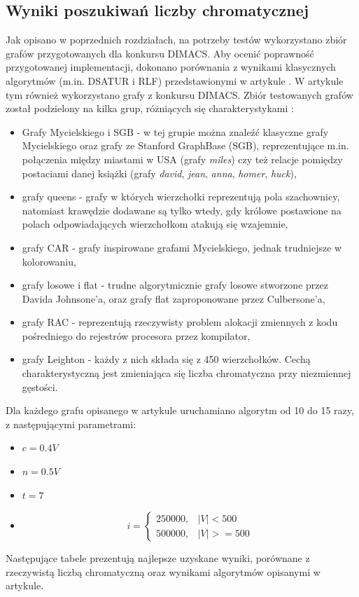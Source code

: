 \documentclass[12pt,a4paper]{article}
\begin{document}
\subsection{Wyniki poszukiwań liczby chromatycznej}
Jak opisano w poprzednich rozdziałach, na potrzeby testów wykorzystano zbiór grafów przygotowanych dla konkursu DIMACS. Aby ocenić poprawność przygotowanej implementacji, dokonano porównania z wynikami klasycznych algorytmów (m.in. DSATUR i RLF) przedstawionymi w artykule \cite{article}.
W artykule tym również wykorzystano grafy z konkursu DIMACS. Zbiór testowanych grafów został podzielony na kilka grup, różniących się charakterystykami :
\begin{itemize}
\item Grafy Mycielskiego i SGB - w tej grupie można znaleźć klasyczne grafy Mycielskiego oraz grafy ze Stanford GraphBase (SGB), reprezentujące m.in. połączenia między miastami w USA (grafy \textit{miles}) czy też relacje pomiędzy postaciami danej książki (grafy \textit{david}, \textit{jean}, \textit{anna}, \textit{homer}, \textit{huck}),
\item grafy queens - grafy w których wierzchołki reprezentują pola szachownicy, natomiast krawędzie dodawane są tylko wtedy, gdy królowe postawione na polach odpowiadających wierzchołkom atakują się wzajemnie,
\item grafy CAR - grafy inspirowane grafami Mycielskiego, jednak trudniejsze w kolorowaniu,
\item grafy losowe i flat - trudne algorytmicznie grafy losowe stworzone przez Davida Johnsone'a, oraz grafy flat zaproponowane przez Culbersone'a,
\item grafy RAC - reprezentują rzeczywisty problem alokacji zmiennych z kodu pośredniego do rejestrów procesora przez kompilator,
\item grafy Leighton - każdy z nich składa się z 450 wierzchołków. Cechą charakterystyczną jest zmieniająca się liczba chromatyczna przy niezmiennej gęstości.
\end{itemize}

Dla każdego grafu opisanego w artykule uruchamiano algorytm od 10 do 15 razy, z następującymi parametrami: 
\begin{itemize}
\item $c = 0.4V$
\item $n = 0.5V$
\item $t = 7$
\item \begin{equation}
    i =
    \begin{cases}
      250 000, & \vert V \vert < 500 \\
      500 000,& \vert V \vert >= 500
    \end{cases}
  \end{equation}
\end{itemize}
Następujące tabele prezentują najlepsze uzyskane wyniki, porównane z rzeczywistą liczbą chromatyczną oraz wynikami algorytmów opisanymi w artykule.
\end{document}
